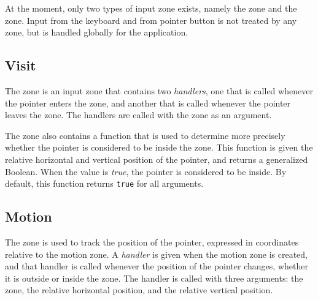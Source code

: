 At the moment, only two types of input zone exists, namely the
 zone and the  zone.  Input from the keyboard
and from pointer button is not treated by any zone, but is handled
globally for the application.  

\subsection{Visit}
\label{sec-zones-input-visit}

The  zone is an input zone that contains two
\emph{handlers}, one that is called whenever the pointer enters the
zone, and another that is called whenever the pointer leaves the zone.
The handlers are called with the zone as an argument.

The  zone also contains a function that is used to
determine more precisely whether the pointer is considered to be
inside the zone.  This function is given the relative horizontal and
vertical position of the pointer, and returns a generalized Boolean.
When the value is \emph{true}, the pointer is considered to be
inside.  By default, this function returns \texttt{true} for all
arguments. 

\subsection{Motion}
\label{sec-zones-input-motion}

The  zone is used to track the position of the pointer,
expressed in coordinates relative to the motion zone.  A
\emph{handler} is given when the motion zone is created, and that
handler is called whenever the position of the pointer changes,
whether it is outside or inside the zone.  The handler is called with
three arguments: the zone, the relative horizontal position, and the
relative vertical position. 

